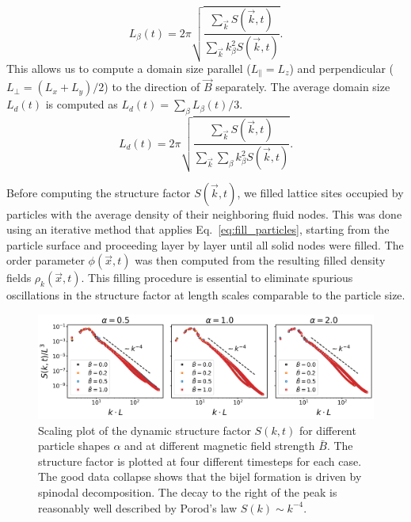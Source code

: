     \begin{equation}
    L_\beta(t)=2\pi\sqrt{\frac{\sum_{\vec{k}}S(\vec{k},t)}{\sum_{\vec{k}}k_\beta^2 S(\vec{k},t)}} .
    \end{equation}
    This allows us to compute a domain size parallel
    (\(L_\parallel=L_z\)) and perpendicular (\(L_\perp=(L_x+L_y)/2\)) to the
    direction of \(\vec{B}\) separately. The average domain size \(L_d(t)\)
    is computed as \(L_d(t)=\sum_\beta L_\beta(t) / 3\).
    \begin{equation}
    L_d(t)=2\pi\sqrt{\frac{\sum_{\vec{k}}S(\vec{k},t)}{\sum_{\vec{k}}\sum_\beta k_\beta^2 S(\vec{k},t)}} .
    \label{eq:directional_structure_factor}
    \end{equation}
    
Before computing the structure factor \(S(\vec{k}, t)\), we filled lattice sites occupied by particles with the average density of 
their neighboring fluid nodes. This was done using an iterative method that applies Eq.~\eqref{eq:fill_particles}, starting from the 
particle surface and proceeding layer by layer until all solid nodes were filled. The order parameter \(\phi(\vec{x}, t)\) was then 
computed from the resulting filled density fields \(\rho_k(\vec{x}, t)\). This filling procedure is essential to eliminate spurious 
oscillations in the structure factor at length scales comparable to the particle size.
    
    
    \begin{figure}
        \centering
        \includegraphics[width=\textwidth]{../figures/results/paper1/structure_factor.png}
        \caption{Scaling plot of the dynamic structure factor $S(k,t)$ for different particle shapes $\alpha$ and at different magnetic field 
                 strength $\bar{B}$. The structure factor is plotted at four different timesteps for each case. The good data collapse shows 
                 that the bijel formation is driven by spinodal decomposition. The decay to the right of the peak is reasonably well described 
                 by Porod's law $S(k)\sim k^{-4}$.}
    \label{fig:structure_factor}
    \end{figure}
    

